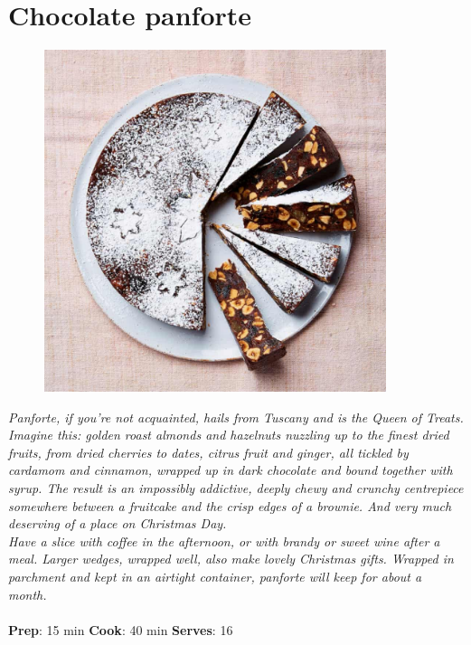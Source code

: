 \documentclass{book}
\begin{document}
\section{Chocolate panforte}
\begin{figure}
\centering\includegraphics[width=10cm,height=10cm,keepaspectratio]{Recipe_Pictures/Chocolate_panforte.png}
\end{figure}
\emph{Panforte, if you’re not acquainted, hails from Tuscany and is the Queen of Treats. Imagine this: golden roast almonds and hazelnuts nuzzling up to the finest dried fruits, from dried cherries to dates, citrus fruit and ginger, all tickled by cardamom and cinnamon, wrapped up in dark chocolate and bound together with syrup. The result is an impossibly addictive, deeply chewy and crunchy centrepiece somewhere between a fruitcake and the crisp edges of a brownie. And very much deserving of a place on Christmas Day.\\ 
Have a slice with coffee in the afternoon, or with brandy or sweet wine after a meal. Larger wedges, wrapped well, also make lovely Christmas gifts. Wrapped in parchment and kept in an airtight container, panforte will keep for about a month.}\\\\ 
\textbf{Prep}: 15 min
\textbf{Cook}: 40 min
\textbf{Serves}: 16
\end{document}
